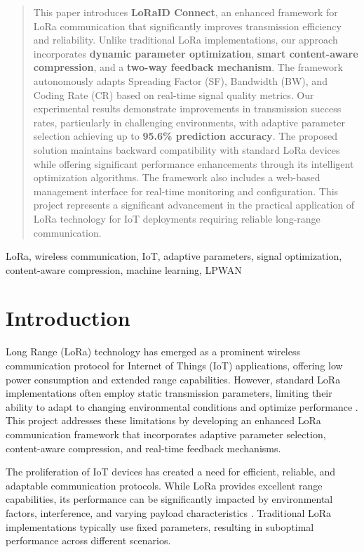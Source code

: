 \documentclass[conference]{IEEEtran}
\begin{document}
\begin{abstract}
This paper introduces \textbf{LoRaID Connect}, an enhanced framework for LoRa communication that significantly improves transmission efficiency and reliability. Unlike traditional LoRa implementations, our approach incorporates \textbf{dynamic parameter optimization}, \textbf{smart content-aware compression}, and a \textbf{two-way feedback mechanism}. The framework autonomously adapts Spreading Factor (SF), Bandwidth (BW), and Coding Rate (CR) based on real-time signal quality metrics. Our experimental results demonstrate improvements in transmission success rates, particularly in challenging environments, with adaptive parameter selection achieving up to \textbf{95.6\% prediction accuracy}. The proposed solution maintains backward compatibility with standard LoRa devices while offering significant performance enhancements through its intelligent optimization algorithms. The framework also includes a web-based management interface for real-time monitoring and configuration. This project represents a significant advancement in the practical application of LoRa technology for IoT deployments requiring reliable long-range communication.
\end{abstract}

\begin{IEEEkeywords}
LoRa, wireless communication, IoT, adaptive parameters, signal optimization, content-aware compression, machine learning, LPWAN
\end{IEEEkeywords}

\section{Introduction}
Long Range (LoRa) technology has emerged as a prominent wireless communication protocol for Internet of Things (IoT) applications, offering low power consumption and extended range capabilities. However, standard LoRa implementations often employ static transmission parameters, limiting their ability to adapt to changing environmental conditions and optimize performance \cite{LoRa_review}. This project addresses these limitations by developing an enhanced LoRa communication framework that incorporates adaptive parameter selection, content-aware compression, and real-time feedback mechanisms.

The proliferation of IoT devices has created a need for efficient, reliable, and adaptable communication protocols. While LoRa provides excellent range capabilities, its performance can be significantly impacted by environmental factors, interference, and varying payload characteristics \cite{LoRa_performance}. Traditional LoRa implementations typically use fixed parameters, resulting in suboptimal performance across different scenarios.
\end{document}
